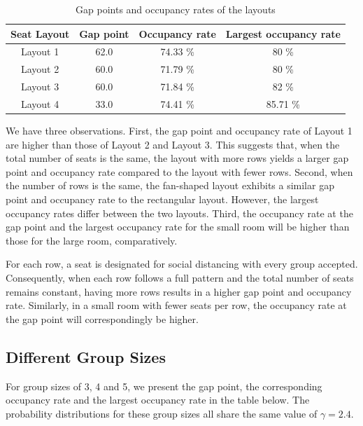 
\begin{table}[ht]
  \centering
  \caption{Gap points and occupancy rates of the layouts}
  \begin{tabular}{|c|c|c|c|}
  \hline
   Seat Layout & Gap point & Occupancy rate & Largest occupancy rate \\
  \hline
   Layout 1 & 62.0 & 74.33 \% & 80 \% \\
   Layout 2 & 60.0 & 71.79 \% & 80 \% \\ 
   Layout 3 & 60.0 & 71.84 \% & 82 \% \\
   Layout 4 & 33.0 & 74.41 \% & 85.71 \% \\
   \hline
  \end{tabular}
\end{table}

We have three observations. First, the gap point and occupancy rate of Layout 1 are higher than those of Layout 2 and Layout 3. This suggests that, when the total number of seats is the same, the layout with more rows yields a larger gap point and occupancy rate compared to the layout with fewer rows.
Second, when the number of rows is the same, the fan-shaped layout exhibits a similar gap point and occupancy rate to the rectangular layout. However, the largest occupancy rates differ between the two layouts. Third, the occupancy rate at the gap point and the largest occupancy rate for the small room will be higher than those for the large room, comparatively.

For each row, a seat is designated for social distancing with every group accepted. Consequently, when each row follows a full pattern and the total number of seats remains constant, having more rows results in a higher gap point and occupancy rate. Similarly, in a small room with fewer seats per row, the occupancy rate at the gap point will correspondingly be higher.


\subsection*{Different Group Sizes}
For group sizes of 3, 4 and 5, we present the gap point, the corresponding occupancy rate and the largest occupancy rate in the table below. The probability distributions for these group sizes all share the same value of $\gamma = 2.4$.

